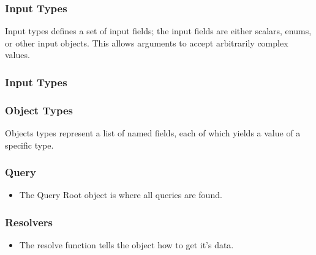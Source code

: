 \documentclass{beamer}
\begin{document}
\begin{frame}
  \frametitle{Input Types}
   Input types defines a set of input fields; the input fields are either scalars, enums, or other input objects. This allows arguments to accept arbitrarily complex values.
   \InputTypeDef
\end{frame}

\begin{frame}
  \frametitle{Input Types}

   \InputTypeApl
\end{frame}

\begin{frame}
  \frametitle{Object Types}

 Objects types represent a list of named fields, each of which yields a value of a specific type.

  \ObjectType
  \end{frame}

\begin{frame}
  \frametitle{Query}

  \begin{itemize}
  \item{The Query Root object is where all queries are found.}
  \end{itemize}

  \RootObjectType

\end{frame}

\begin{frame}
  \frametitle{Resolvers}

  \begin{itemize}
    \item{The resolve function tells the object how to get it's data.}
  \end{itemize}

  \Resolver
\end{frame}
\end{document}
